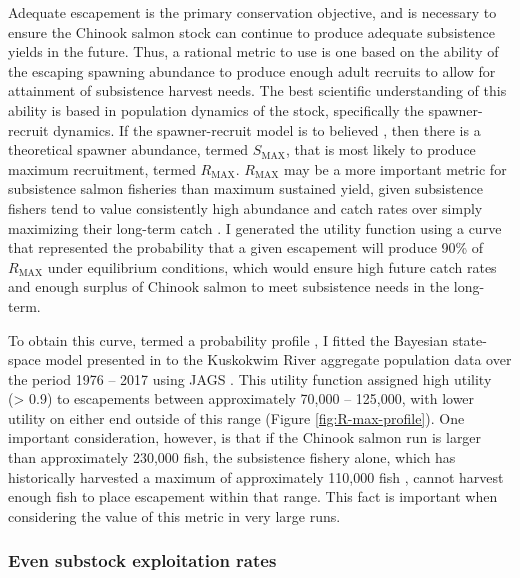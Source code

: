 \documentclass[12pt,]{book}
\theoremstyle{definition}
\theoremstyle{definition}
\theoremstyle{definition}
\theoremstyle{remark}
\begin{document}
\noindent
Adequate escapement is the primary conservation objective, and is
necessary to ensure the Chinook salmon stock can continue to produce
adequate subsistence yields in the future. Thus, a rational metric to
use is one based on the ability of the escaping spawning abundance to
produce enough adult recruits to allow for attainment of subsistence
harvest needs. The best scientific understanding of this ability is
based in population dynamics of the stock, specifically the
spawner-recruit dynamics. If the \citet{ricker-1954} spawner-recruit
model is to believed \citep[as is often done in salmon population
analyses,][see Chapter \ref{ch4}, this dissertation as
well]{fleischman-etal-2013}, then there is a theoretical spawner
abundance, termed \(S_{\text{MAX}}\), that is most likely to produce
maximum recruitment, termed \(R_{\text{MAX}}\). \(R_{\text{MAX}}\) may
be a more important metric for subsistence salmon fisheries than maximum
sustained yield, given subsistence fishers tend to value consistently
high abundance and catch rates over simply maximizing their long-term
catch \citep{hamazaki-etal-2012}. I generated the utility function using
a curve that represented the probability that a given escapement will
produce 90\% of \(R_{\text{MAX}}\) under equilibrium conditions, which
would ensure high future catch rates and enough surplus of Chinook
salmon to meet subsistence needs in the long-term.

To obtain this curve, termed a probability profile
\citep{fleischman-etal-2013}, I fitted the Bayesian state-space model
presented in \citet{hamazaki-etal-2012} to the Kuskokwim River aggregate
population data over the period 1976 -- 2017 using JAGS
\citep{plummer-2017}. This utility function assigned high utility
(\textgreater{} 0.9) to escapements between approximately 70,000 --
125,000, with lower utility on either end outside of this range (Figure
\ref{fig:R-max-profile}). One important consideration, however, is that
if the Chinook salmon run is larger than approximately 230,000 fish, the
subsistence fishery alone, which has historically harvested a maximum of
approximately 110,000 fish \citep{hamazaki-2011}, cannot harvest enough
fish to place escapement within that range. This fact is important when
considering the value of this metric in very large runs.

\subsubsection{Even substock exploitation rates}\label{U-metric}
\end{document}
